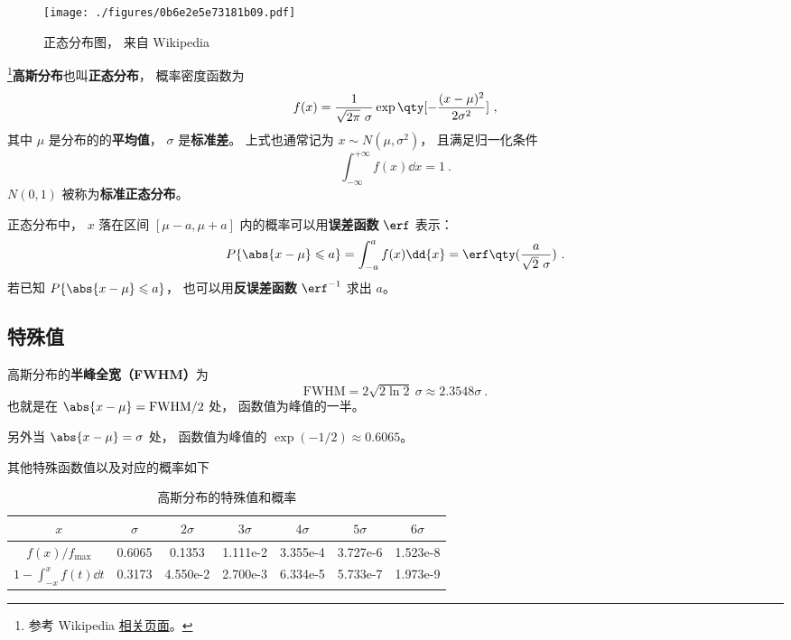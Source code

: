 

\begin{figure}[ht]
\centering
\texttt{[image: ./figures/0b6e2e5e73181b09.pdf]}
\caption{正态分布图， 来自 Wikipedia} \label{fig_GausPD_1}
\end{figure}

\footnote{参考 Wikipedia \href{https://en.wikipedia.org/wiki/Normal_distribution}{相关页面}。}\textbf{高斯分布}也叫\textbf{正态分布}， 概率密度函数为
\begin{equation}\label{eq_GausPD_1}
f(x) = \frac{1}{\sqrt{2\pi}\ \sigma} \exp\qty[-\frac{(x - \mu )^2}{2\sigma ^2}]~,
\end{equation}
其中 $\mu$ 是分布的的\textbf{平均值}， $\sigma$ 是\textbf{标准差}。 上式也通常记为 $x \sim N(\mu,\sigma^2)$， 且满足归一化条件
\begin{equation}\label{eq_GausPD_7}
\int_{-\infty}^{+\infty} f(x) \dd{x} = 1~.
\end{equation}
$N(0,1)$ 被称为\textbf{标准正态分布}。

正态分布中， $x$ 落在区间 $[\mu-a,\mu+a]$ 内的概率可以用\textbf{误差函数} $\erf$ 表示：
\begin{equation}
P\{\abs{x-\mu} \leqslant a\} = \int_{-a}^a f(x)\dd{x} = \erf\qty(\frac{a}{\sqrt{2}\ \sigma})~.
\end{equation}
若已知 $P\{\abs{x-\mu} \leqslant a\}$， 也可以用\textbf{反误差函数} $\erf^{-1}$ 求出 $a$。

\subsection{特殊值}
高斯分布的\textbf{半峰全宽（FWHM）}为
\begin{equation}
\text{FWHM} = 2\sqrt{2\ln 2}\ \sigma \approx 2.3548 \sigma~.
\end{equation}
也就是在 $\abs{x - \mu} = \text{FWHM}/2$ 处， 函数值为峰值的一半。

另外当 $\abs{x - \mu} = \sigma$ 处， 函数值为峰值的 $\exp(-1/2) \approx 0.6065$。

其他特殊函数值以及对应的概率如下
\begin{table}[ht]
\centering
\caption{高斯分布的特殊值和概率}\label{tab_GausPD1}
\begin{tabular}{|c|c|c|c|c|c|c|}
\hline
$x$ & $\sigma$ & $2\sigma$ & $3\sigma$ & $4\sigma$ & $5\sigma$ & $6\sigma$ \\
\hline
$f(x)/f_\text{max}$ &0.6065 & 0.1353 & 1.111e-2 & 3.355e-4 & 3.727e-6 & 1.523e-8 \\
\hline
$1-\int_{-x}^x f(t)\dd{t}$ & 0.3173 & 4.550e-2 & 2.700e-3 & 6.334e-5 & 5.733e-7 & 1.973e-9 \\
\hline
\end{tabular}
\end{table}

